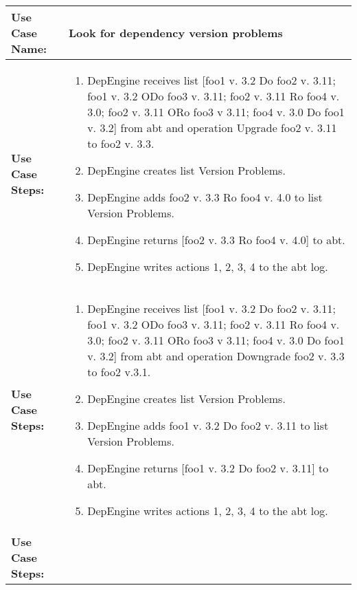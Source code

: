
\begin{tabularx}{\linewidth}{|l|X|}
\hline
\textbf{Use Case Name:} & \textbf{Look for dependency version problems} \\
\hline
\textbf{Use Case Steps:} & 
\begin{minipage}{\linewidth} 
  \vspace{0.05em}
  \begin{enumerate}
  \item DepEngine receives list [foo1 v. 3.2 Do foo2 v. 3.11; foo1 v. 3.2 ODo foo3 v. 3.11; foo2 v. 3.11 Ro foo4 v. 3.0; foo2 v. 3.11 ORo foo3 v 3.11; foo4 v. 3.0 Do foo1 v. 3.2] from abt and operation Upgrade foo2 v. 3.11 to foo2 v. 3.3.
  \item DepEngine creates list Version Problems.
  \item DepEngine adds foo2 v. 3.3 Ro foo4 v. 4.0 to list Version Problems.
  \item DepEngine returns [foo2 v. 3.3 Ro foo4 v. 4.0] to abt.
  \item DepEngine writes actions 1, 2, 3, 4 to the abt log.
    \end{enumerate}
  \vspace{0.05em}
\end{minipage}
\\
\hline 
\textbf{Use Case Steps:} & 
\begin{minipage}{\linewidth} 
  \vspace{0.05em}
  \begin{enumerate}
  \item DepEngine receives list [foo1 v. 3.2 Do foo2 v. 3.11; foo1 v. 3.2 ODo foo3 v. 3.11; foo2 v. 3.11 Ro foo4 v. 3.0; foo2 v. 3.11 ORo foo3 v 3.11; foo4 v. 3.0 Do foo1 v. 3.2] from abt and operation Downgrade foo2 v. 3.3 to foo2 v.3.1.
  \item DepEngine creates list Version Problems.
  \item DepEngine adds foo1 v. 3.2 Do foo2 v. 3.11 to list Version Problems.
  \item DepEngine returns [foo1 v. 3.2 Do foo2 v. 3.11] to abt.
  \item DepEngine writes actions 1, 2, 3, 4 to the abt log.
    \end{enumerate}
  \vspace{0.05em}
\end{minipage}
\\
\hline 
\textbf{Use Case Steps:} & 
\begin{minipage}{\linewidth} 
  \vspace{0.05em}

\end{minipage}
\end{tabularx}
